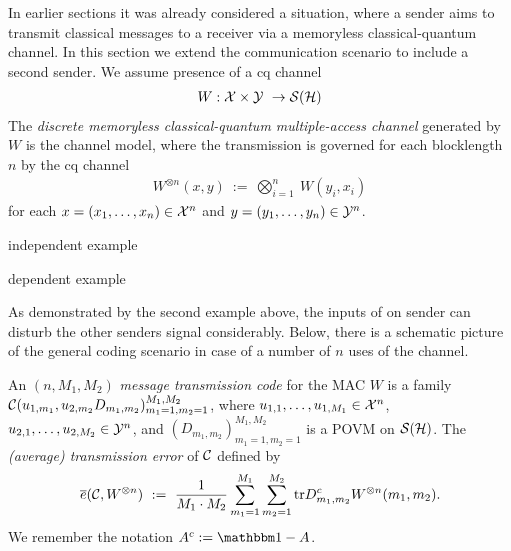 In earlier sections it was already considered a situation, where a sender aims to transmit classical messages to a receiver via a memoryless classical-quantum channel. In this section we extend the communication scenario to include a second sender. \newline 
We assume presence of a cq channel 
\begin{align}
 W: {\mathcal X} \times {\mathcal Y} \ \rightarrow {\mathcal S}({\mathcal H})
\end{align}
The \emph{discrete memoryless classical-quantum multiple-access channel} generated by $W$ is the channel model, where the transmission is governed for each blocklength $n$ by the cq channel
\begin{align}
 W^{\otimes n}(x, y) \ := \ \bigotimes_{i=1}^n \ W(y_i, x_i)
\end{align}
for each $x = (x_1,\dots,x_n) \in {\mathcal X}^n$ and $y = (y_1,\dots,y_n) \in {\mathcal Y}^n$. 
\begin{example}
independent example
\end{example} 
\begin{example}
dependent example
\end{example} 
As demonstrated by the second example above, the inputs of on sender can disturb the other senders signal considerably. 
Below, there is a schematic picture of the general coding scenario in case of a number of $n$ uses of the channel. 
\begin{definition}
An $(n, M_1, M_2)$ \emph{message transmission code} for the MAC $W$ is a family ${\mathcal C}(u_{1,m_1}, u_{2,m_2} D_{m_1,m_2})_{m_1=1, m_2=1}^{M_1,M_2}$, where $u_{1,1},\dots,u_{1,M_1} \in {\mathcal X}^n$, $u_{2,1},\dots,u_{2,M_2} \in {\mathcal Y}^n$, and $(D_{m_1,m_2})_{m_1=1,m_2=1}^{M_1,M_2}$ is a POVM on ${\mathcal S}({\mathcal H})$.
The \emph{(average) transmission error} of ${\mathcal C}$ defined by 
\begin{align}
 \overline{e}({\mathcal C}, W^{\otimes n}) \ := \ \frac{1}{M_1 \cdot M_2} \sum_{m_1=1}^{M_1} \sum_{m_2=1}^{M_2} \mathrm{tr} D_{m_1,m_2}^c W^{\otimes n}(m_1,m_2).
\end{align}
We remember the notation $A^c := \bbmeins - A$. 
\end{definition} 



